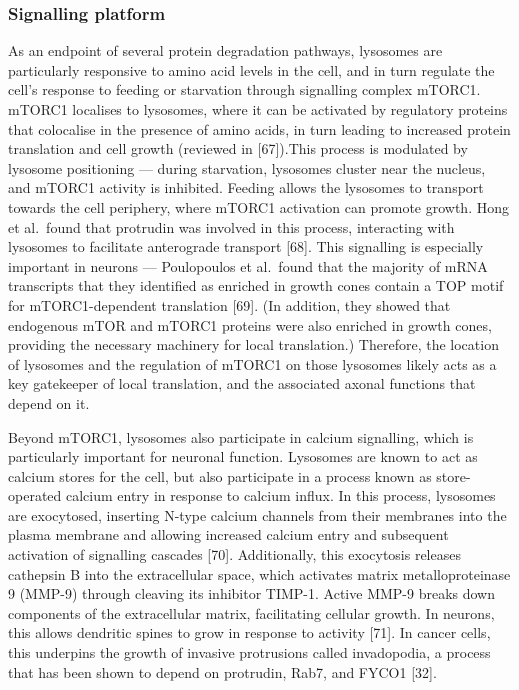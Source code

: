 \documentclass[
  12pt,
  a4paper,
]{book}
\begin{document}
\hypertarget{signalling-platform}{%
\subsubsection{Signalling platform}\label{signalling-platform}}

As an endpoint of several protein degradation pathways, lysosomes are particularly responsive to amino acid levels in the cell, and in turn regulate the cell's response to feeding or starvation through signalling complex mTORC1. mTORC1 localises to lysosomes, where it can be activated by regulatory proteins that colocalise in the presence of amino acids, in turn leading to increased protein translation and cell growth (reviewed in {[}67{]}).This process is modulated by lysosome positioning --- during starvation, lysosomes cluster near the nucleus, and mTORC1 activity is inhibited. Feeding allows the lysosomes to transport towards the cell periphery, where mTORC1 activation can promote growth. Hong et al.~found that protrudin was involved in this process, interacting with lysosomes to facilitate anterograde transport {[}68{]}. This signalling is especially important in neurons --- Poulopoulos et al.~found that the majority of mRNA transcripts that they identified as enriched in growth cones contain a TOP motif for mTORC1-dependent translation {[}69{]}. (In addition, they showed that endogenous mTOR and mTORC1 proteins were also enriched in growth cones, providing the necessary machinery for local translation.) Therefore, the location of lysosomes and the regulation of mTORC1 on those lysosomes likely acts as a key gatekeeper of local translation, and the associated axonal functions that depend on it.

Beyond mTORC1, lysosomes also participate in calcium signalling, which is particularly important for neuronal function. Lysosomes are known to act as calcium stores for the cell, but also participate in a process known as store-operated calcium entry in response to calcium influx. In this process, lysosomes are exocytosed, inserting N-type calcium channels from their membranes into the plasma membrane and allowing increased calcium entry and subsequent activation of signalling cascades {[}70{]}. Additionally, this exocytosis releases cathepsin B into the extracellular space, which activates matrix metalloproteinase 9 (MMP-9) through cleaving its inhibitor TIMP-1. Active MMP-9 breaks down components of the extracellular matrix, facilitating cellular growth. In neurons, this allows dendritic spines to grow in response to activity {[}71{]}. In cancer cells, this underpins the growth of invasive protrusions called invadopodia, a process that has been shown to depend on protrudin, Rab7, and FYCO1 {[}32{]}.
\end{document}
